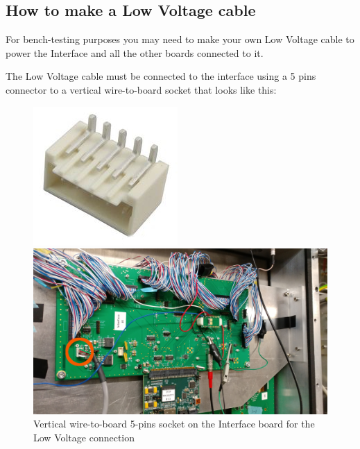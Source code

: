 \subsection{How to make a Low Voltage cable}\label{sec:how-make-low-voltage-cable}
For bench-testing purposes you may need to make your own Low Voltage cable to
power the Interface and all the other boards connected to it.

The Low Voltage cable must be connected to the interface using a 5 pins
connector to a vertical wire-to-board socket that looks like this:
\begin{figure}[H]
  \centering
  \begin{minipage}{0.15\linewidth}
    \centering \includegraphics[width=\linewidth,frame]{low-vol-socket1}
  \end{minipage}%
  \begin{minipage}{0.6\linewidth}
    \centering \includegraphics[width=0.9\linewidth,frame]{low-vol-socket2}
  \end{minipage}
  \caption{Vertical wire-to-board 5-pins socket on the Interface board for the
    Low Voltage connection}\label{low-vol-socket}
\end{figure}
